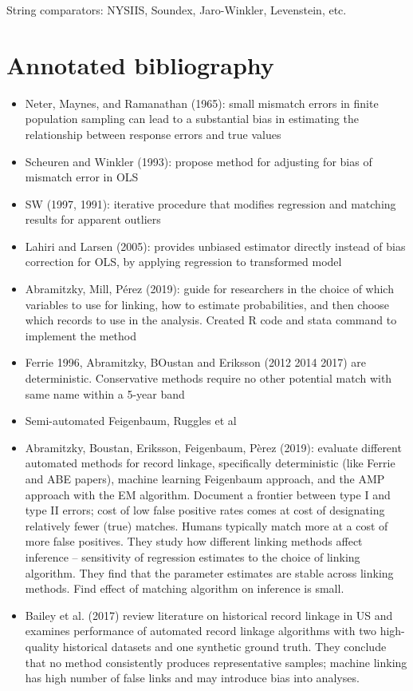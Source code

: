 \documentclass[12pt]{article}
\begin{document}
String comparators: NYSIIS, Soundex, Jaro-Winkler, Levenstein, etc. 




\section{Annotated bibliography}
\begin{itemize}
\item Neter, Maynes, and Ramanathan (1965): small mismatch errors in finite population sampling can lead to a substantial bias in estimating the relationship between response errors and true values
\item Scheuren and Winkler (1993): propose method for adjusting for bias of mismatch error in OLS
\item SW (1997, 1991): iterative procedure that modifies regression and matching results for apparent outliers 
\item Lahiri and Larsen (2005):   provides unbiased estimator directly instead of bias correction for OLS, by applying regression to transformed model 
\item Abramitzky, Mill, P\'erez (2019): guide for researchers in the choice of which variables to use for linking, how to estimate probabilities, and then choose which records to use in the analysis.  Created R code and stata command to implement the method
\item Ferrie 1996, Abramitzky, BOustan and Eriksson (2012 2014 2017) are deterministic.  Conservative methods require no other potential match with same name within a 5-year band
\item Semi-automated Feigenbaum, Ruggles et al 
\item Abramitzky, Boustan, Eriksson, Feigenbaum, P\`erez (2019): evaluate different automated methods for record linkage, specifically deterministic (like Ferrie and ABE papers), machine learning Feigenbaum approach, and the AMP approach with the EM algorithm.  Document a frontier between type I and type II errors; cost of low false positive rates comes at cost of designating relatively fewer (true) matches.  Humans typically match more at a cost of more false positives.  They study how different linking methods affect inference -- sensitivity of regression estimates to the choice of linking algorithm.  They find that the parameter estimates are stable across linking methods.  Find effect of matching algorithm on inference is small. 
\item Bailey et al. (2017) review literature on historical record linkage in US and examines performance of automated record linkage algorithms with two high-quality historical datasets and one synthetic ground truth.  They conclude that no method consistently produces representative samples; machine linking has high number of false links and may introduce bias into analyses.  


\end{itemize}
\end{document}
